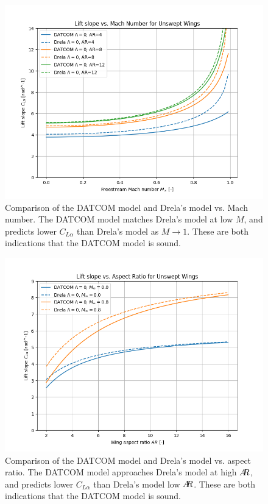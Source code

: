 \documentclass[12pt]{article}
\newcommand{\ar}{A\mkern-6mu R}
\begin{document}
\begin{figure}[hbt!]
    \centering
    \includegraphics[width=1\textwidth]{figures/wing_lift_model_compare/CLa_vs_mach}
    \caption{\label{fig:wing_model_CLa_vs_mach} Comparison of the DATCOM model and Drela's model vs. Mach number. The DATCOM model matches Drela's model at low $M$, and predicts lower $C_{L\alpha}$ than Drela's model as $M \rightarrow 1$. These are both indications that the DATCOM model is sound.}
\end{figure}

\begin{figure}[hbt!]
    \centering
    \includegraphics[width=1\textwidth]{figures/wing_lift_model_compare/CLa_vs_aspect}
    \caption{\label{fig:wing_model_CLa_vs_aspect} Comparison of the DATCOM model and Drela's model vs. aspect ratio. The DATCOM model approaches Drela's model at high $\ar$, and predicts lower $C_{L\alpha}$ than Drela's model low $\ar$. These are both indications that the DATCOM model is sound.}
\end{figure}
\end{document}
